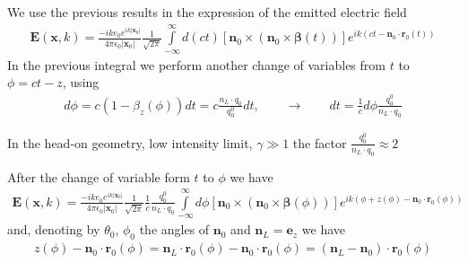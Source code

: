 We use the previous results in the expression of the emitted electric field
\begin{align}
  {\bm E}({\bm x},k) =\frac{-i k e_0 e^{ik |{\bm x}_0|}}{4\pi\epsilon_0|{\bm x}_0|}\frac1{\sqrt{2\pi}}\int\limits_{-\infty}^{\infty}d(ct)\left[{{\bm n}_0\times({\bm n}_0\times{\boldsymbol\beta}(t))}\right]e^{ik(ct-{\bm n}_0\cdot{\bm r}_0(t))}
\end{align}
In the previous integral we perform another change of variables from $t$ to $\phi=ct-z$, using
\begin{align}
  d\phi = c (1-\beta_z(\phi)) dt = c\frac{n_L\cdot q_0}{q_0^0} dt,\qquad \rightarrow \qquad dt=\frac1c d\phi\frac{q_0^0}{n_L\cdot q_0}
\end{align}
\begin{warningbox}{}
  In the head-on geometry, low intensity limit, $\gamma\gg1$ the factor $\frac{q_0^0}{n_L\cdot q_0}\approx 2$
\end{warningbox}
After the change of variable form $t$ to $\phi$ we have
\begin{align}
  {\bm E}({\bm x},k) =\frac{-i k e_0 e^{ik |{\bm x}_0|}}{4\pi\epsilon_0|{\bm x}_0|}\frac1{\sqrt{2\pi}}\frac1{c}\frac{q_0^0}{n_L\cdot q_0}\int\limits_{-\infty}^{\infty}d\phi\left[{{\bm n}_0\times({\bm n}_0\times {\boldsymbol\beta}(\phi))}\right]e^{ik(\phi +z(\phi)-{{\bm n}_0\cdot{\bm r}_0(\phi)})}
\end{align}
and, denoting by $\theta_0$, $\phi_0$ the angles of ${\bm n}_0$ and ${\bm n}_L={\bm e}_z$
we have
\begin{align}
  z(\phi)-{\bm n}_0\cdot{\bm r}_0(\phi)={\bm n}_L\cdot{\bm r}_0(\phi)-{\bm n}_0\cdot{\bm r}_0(\phi)=({\bm n}_L-{\bm n}_0)\cdot{\bm r}_0(\phi)
\end{align}

